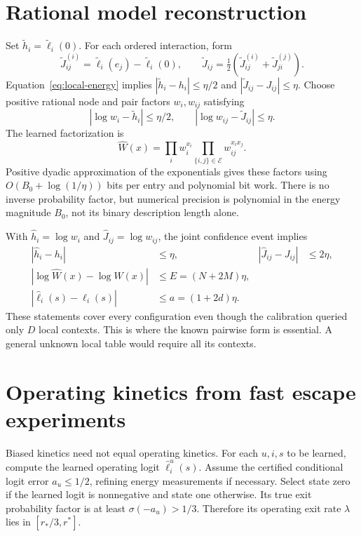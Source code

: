 \documentclass[11pt]{article}
\newcommand{\sig}{\sigma}
\newcommand{\calE}{\mathcal E}
\begin{document}
\section{Rational model reconstruction}
\label{sec:reconstruct}
Set $\widetilde h_i=\widetilde\ell_i(0)$. For each ordered interaction, form
\[
 \widetilde J_{ij}^{(i)}=\widetilde\ell_i(e_j)-\widetilde\ell_i(0),
 \qquad \widetilde J_{ij}=\tfrac12(\widetilde J_{ij}^{(i)}+\widetilde J_{ji}^{(j)}).
\]
Equation~\eqref{eq:local-energy} implies $|\widetilde h_i-h_i|\le\eta/2$ and $|\widetilde J_{ij}-J_{ij}|\le\eta$. Choose positive rational node and pair factors $w_i,w_{ij}$ satisfying
\[
 |\log w_i-\widetilde h_i|\le\eta/2,
 \qquad |\log w_{ij}-\widetilde J_{ij}|\le\eta.
\]
The learned factorization is
\[
 \widehat W(x)=\prod_i w_i^{x_i}\prod_{\{i,j\}\in\calE}w_{ij}^{x_ix_j}.
\]
Positive dyadic approximation of the exponentials gives these factors using $O(B_0+\log(1/\eta))$ bits per entry and polynomial bit work. There is no inverse probability factor, but numerical precision is polynomial in the energy magnitude $B_0$, not its binary description length alone.

With $\widehat h_i=\log w_i$ and $\widehat J_{ij}=\log w_{ij}$, the joint confidence event implies
\begin{equation}
 \begin{aligned}
 |\widehat h_i-h_i|&\le\eta, & |\widehat J_{ij}-J_{ij}|&\le2\eta,\\
 |\log\widehat W(x)-\log W(x)|&\le E=(N+2M)\eta,\\
 |\widehat\ell_i(s)-\ell_i(s)|&\le a=(1+2d)\eta.
 \end{aligned}
 \label{eq:errors}
\end{equation}
These statements cover every configuration even though the calibration queried only $D$ local contexts. This is where the known pairwise form is essential. A general unknown local table would require all its contexts.

\section{Operating kinetics from fast escape experiments}
\label{sec:kinetics}
Biased kinetics need not equal operating kinetics. For each $u,i,s$ to be learned, compute the learned operating logit $\widehat\ell_i^u(s)$. Assume the certified conditional logit error $a_u\le1/2$, refining energy measurements if necessary. Select state zero if the learned logit is nonnegative and state one otherwise. Its true exit probability factor is at least $\sig(-a_u)>1/3$. Therefore its operating exit rate $\lambda$ lies in $[r_*/3,r^*]$.
\end{document}
